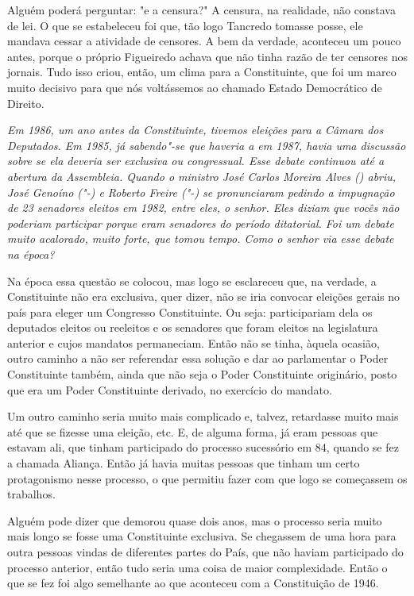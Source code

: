 Alguém poderá perguntar: "e a censura?" A censura, na realidade, não
constava de lei. O que se estabeleceu foi que, tão logo Tancredo tomasse
posse, ele mandava cessar a atividade de censores. A bem da verdade,
aconteceu um pouco antes, porque o próprio Figueiredo achava que não
tinha razão de ter censores nos jornais. Tudo isso criou, então, um
clima para a Constituinte, que foi um marco muito decisivo para que nós
voltássemos ao chamado Estado Democrático de Direito.

\medskip

\noindent\emph{Em 1986, um ano antes da Constituinte, tivemos eleições para a
Câmara dos Deputados. Em 1985, já sabendo"-se que haveria a  em 1987,
havia uma discussão sobre se ela deveria ser exclusiva ou congressual.
Esse debate continuou até a abertura da Assembleia. Quando o ministro
José Carlos Moreira Alves () abriu, José Genoíno ("-) e Roberto
Freire ("-) se pronunciaram pedindo a impugnação de 23 senadores
eleitos em 1982, entre eles, o senhor. Eles diziam que vocês não
poderiam participar porque eram senadores do período ditatorial. Foi um
debate muito acalorado, muito forte, que tomou tempo. Como o senhor via
esse debate na época?}

Na época essa questão se colocou, mas logo se
esclareceu que, na verdade, a Constituinte não era exclusiva, quer
dizer, não se iria convocar eleições gerais no país para eleger um
Congresso Constituinte. Ou seja: participariam dela os deputados eleitos
ou reeleitos e os senadores que foram eleitos na legislatura anterior e
cujos mandatos permaneciam. Então não se tinha, àquela ocasião, outro
caminho a não ser referendar essa solução e dar ao parlamentar o Poder
Constituinte também, ainda que não seja o Poder Constituinte originário,
posto que era um Poder Constituinte derivado, no exercício do mandato.

Um outro caminho seria muito mais complicado e, talvez, retardasse muito
mais até que se fizesse uma eleição, etc. E, de alguma forma, já eram
pessoas que estavam ali, que tinham participado do processo sucessório
em 84, quando se fez a chamada Aliança. Então já havia muitas pessoas
que tinham um certo protagonismo nesse processo, o que permitiu fazer
com que logo se começassem os trabalhos.

Alguém pode dizer que demorou quase dois anos, mas o processo seria
muito mais longo se fosse uma Constituinte exclusiva. Se chegassem de
uma hora para outra pessoas vindas de diferentes partes do País, que não
haviam participado do processo anterior, então tudo seria uma coisa de
maior complexidade. Então o que se fez foi algo semelhante ao que
aconteceu com a Constituição de 1946.


